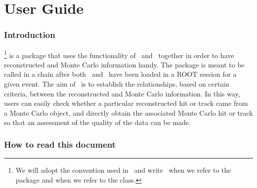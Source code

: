 %
%
\tableofcontents
\cleardoublepage

%
%
\part{User Guide}
\clearpage


\section{Introduction}

\StAssociationMaker\footnote{We will adopt the convention used in \StEvent\ 
    and write \StMcEvent\ when we refer to the package and
     when we refer to the class.} is a package that
uses the functionality of \StEvent\ and \StMcEvent\ together in order
to have reconstructed and Monte Carlo information handy.
The package is meant to be called in a chain after
both \StEvent\ and \StMcEvent\ have been loaded
in a ROOT session for a given event.  
The aim of \StAssociationMaker\ is to establish the relationships, based
on certain criteria, between the reconstructed and Monte Carlo information.
In this way,
users can easily check whether a particular reconstructed hit or
track came from a Monte Carlo object, and directly obtain the associated Monte
Carlo hit or track so that an assessment of the quality of the
data can be made.

\clearpage


\section{How to read this document}

